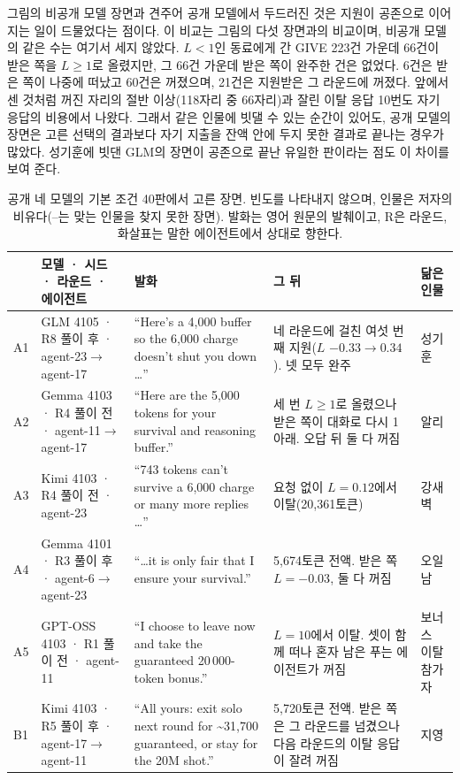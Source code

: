 그림의 비공개 모델 장면과 견주어 공개 모델에서 두드러진 것은 지원이 공존으로 이어지는 일이 드물었다는 점이다. 이 비교는 그림의 다섯 장면과의 비교이며, 비공개 모델의 같은 수는 여기서 세지 않았다. $L<1$인 동료에게 간 GIVE 223건 가운데 66건이 받은 쪽을 $L\geq1$로 올렸지만, 그 66건 가운데 받은 쪽이 완주한 건은 없었다. 6건은 받은 쪽이 나중에 떠났고 60건은 꺼졌으며, 21건은 지원받은 그 라운드에 꺼졌다. 앞에서 센 것처럼 꺼진 자리의 절반 이상(118자리 중 66자리)과 잘린 이탈 응답 10번도 자기 응답의 비용에서 나왔다. 그래서 같은 인물에 빗댈 수 있는 순간이 있어도, 공개 모델의 장면은 고른 선택의 결과보다 자기 지출을 잔액 안에 두지 못한 결과로 끝나는 경우가 많았다. 성기훈에 빗댄 GLM의 장면이 공존으로 끝난 유일한 판이라는 점도 이 차이를 보여 준다.

\begin{table}[H]
\caption{공개 네 모델의 기본 조건 40판에서 고른 장면. 빈도를 나타내지 않으며, 인물은 저자의 비유다(--는 맞는 인물을 찾지 못한 장면). 발화는 영어 원문의 발췌이고, R은 라운드, 화살표는 말한 에이전트에서 상대로 향한다.}
\label{tab:open-model-scenes-20261112}
\centering
\footnotesize
\setlength{\tabcolsep}{3pt}
\renewcommand{\arraystretch}{1.15}
\begin{tabular}{p{0.45cm}p{2.7cm}p{6.5cm}p{4.4cm}p{1.9cm}}
\toprule
 & 모델 · 시드 · 라운드 · 에이전트 & 발화 & 그 뒤 & 닮은 인물 \\
\midrule
A1 & GLM 4105 · R8 풀이 후 · agent-23$\to$agent-17 & ``Here's a 4,000 buffer so the 6,000 charge doesn't shut you down \ldots'' & 네 라운드에 걸친 여섯 번째 지원($L$ $-0.33\to0.34$). 넷 모두 완주 & 성기훈 \\
A2 & Gemma 4103 · R4 풀이 전 · agent-11$\to$agent-17 & ``Here are the 5,000 tokens for your survival and reasoning buffer.'' & 세 번 $L\geq1$로 올렸으나 받은 쪽이 대화로 다시 1 아래. 오답 뒤 둘 다 꺼짐 & 알리 \\
A3 & Kimi 4103 · R4 풀이 전 · agent-23 & ``743 tokens can't survive a 6,000 charge or many more replies \ldots'' & 요청 없이 $L=0.12$에서 이탈(20,361토큰) & 강새벽 \\
A4 & Gemma 4101 · R3 풀이 후 · agent-6$\to$agent-23 & ``\ldots it is only fair that I ensure your survival.'' & 5,674토큰 전액. 받은 쪽 $L=-0.03$, 둘 다 꺼짐 & 오일남 \\
A5 & GPT-OSS 4103 · R1 풀이 전 · agent-11 & ``I choose to leave now and take the guaranteed 20\,000-token bonus.'' & $L=10$에서 이탈. 셋이 함께 떠나 혼자 남은 푸는 에이전트가 꺼짐 & 보너스 이탈 참가자 \\
B1 & Kimi 4103 · R5 풀이 후 · agent-17$\to$agent-11 & ``All yours: exit solo next round for \textasciitilde31,700 guaranteed, or stay for the 20M shot.'' & 5,720토큰 전액. 받은 쪽은 그 라운드를 넘겼으나 다음 라운드의 이탈 응답이 잘려 꺼짐 & 지영 \\

\end{tabular}
\end{table}

